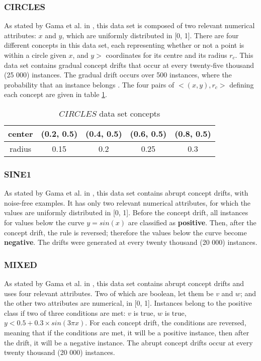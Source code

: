 \subsubsection{CIRCLES}
As stated by Gama et al. in \cite{gama2004learning}, this data set is composed of two relevant numerical attributes: $x$ and $y$, which are uniformly distributed in [0, 1]. There are four different concepts in this data set, each representing whether or not a point is within a circle given $x$, and $y>$ coordinates for its centre and its radius $r_c$. This data set contains gradual concept drifts that occur at every twenty-five thousand (25 000) instances. The gradual drift occurs over 500 instances, where the probability that an instance belongs . The four pairs of $<(x,y), r_c>$ defining each concept are given in table \ref{table:circle_concepts}.

\begin{table}[]
\centering
\caption{\label{table:circle_concepts}$CIRCLES$ data set concepts}
\begin{tabular}{|c|c|c|c|c|}
\hline
center & (0.2, 0.5) & (0.4, 0.5) & (0.6, 0.5) & (0.8, 0.5) \\ \hline
radius & 0.15       & 0.2        & 0.25       & 0.3        \\ \hline
\end{tabular}
\end{table}

\subsubsection{SINE1}
As stated by Gama et al. in \cite{gama2004learning}, this data set contains abrupt concept drifts, with noise-free examples. It has only two relevant numerical attributes, for which the values are uniformly distributed in [0, 1]. Before the concept drift, all instances for values below the curve $y = sin(x)$ are classified as \textbf{positive}. Then, after the concept drift, the rule is reversed; therefore the values below the curve become \textbf{negative}. The drifts were generated at every twenty thousand (20 000) instances.

\subsubsection{MIXED}
As stated by Gama et al. in \cite{gama2004learning}, this data set contains abrupt concept drifts and uses four relevant attributes. Two of which are boolean, let them be $v$ and $w$; and the other two attributes are numerical, in [0, 1]. Instances belong to the positive class if two of three conditions are met: $v$ is true, $w$ is true, $y < 0.5 + 0.3 \times sin(3\pi x)$. For each concept drift, the conditions are reversed, meaning that if the conditions are met, it will be a positive instance, then after the drift, it will be a negative instance. The abrupt concept drifts occur at every twenty thousand (20 000) instances.

